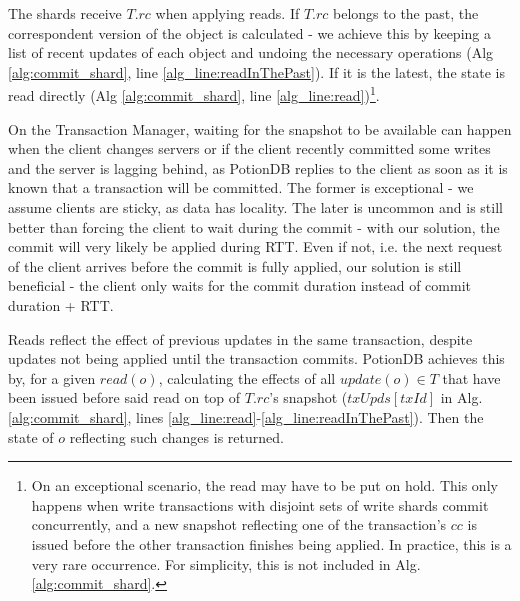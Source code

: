 \documentclass[sigplan,10pt]{acmart}
\begin{document}
The shards receive $T.rc$ when applying reads.
If $T.rc$ belongs to the past, the correspondent version of the object is calculated - we achieve this by keeping a list of recent updates of each object and undoing the necessary operations (Alg \ref{alg:commit_shard}, line \ref{alg_line:readInThePast}). %
If it is the latest, the state is read directly (Alg \ref{alg:commit_shard}, line \ref{alg_line:read})\footnote{On an exceptional scenario, the read may have to be put on hold. This only happens when write transactions with disjoint sets of write shards commit concurrently, and a new snapshot reflecting one of the transaction's $cc$ is issued before the other transaction finishes being applied. In practice, this is a very rare occurrence. For simplicity, this is not included in Alg. \ref{alg:commit_shard}.}.

On the Transaction Manager, waiting for the snapshot to be available can happen when the client changes servers or if the client recently committed some writes and the server is lagging behind, as PotionDB replies to the client as soon as it is known that a transaction will be committed.
The former is exceptional - we assume clients are sticky, as data has locality.
The later is uncommon and is still better than forcing the client to wait during the commit - with our solution, the commit will very likely be applied during RTT.
Even if not, i.e. the next request of the client arrives before the commit is fully applied, our solution is still beneficial -  the client only waits for the commit duration instead of commit duration + RTT.

Reads reflect the effect of previous updates in the same transaction, despite updates not being applied until the transaction commits.
PotionDB achieves this by, for a given $\mathit{read(o)}$, calculating the effects of all $\mathit{update(o)} \in T$ that have been issued before said read on top of $T.rc$'s snapshot ($\mathit{txUpds[txId]}$ in Alg. \ref{alg:commit_shard}, lines \ref{alg_line:read}-\ref{alg_line:readInThePast}).
Then the state of $o$ reflecting such changes is returned.
\end{document}
